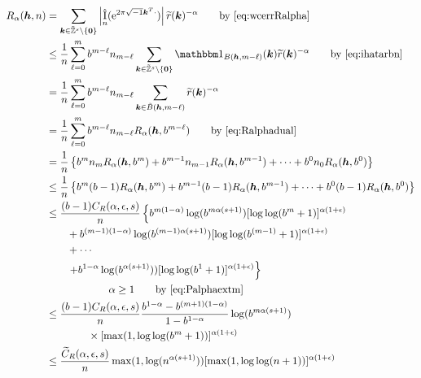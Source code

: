\documentclass{amsart}
\newcommand{\tr}{\widetilde{r}}
\DeclareMathOperator{\appxint}{\hat{I}}
\begin{document}
\begin{align*}
      R_\alpha(\vh,n) & = \sum_{\vk \in \tilde \integers^s \setminus\{\vzero\}} \abs{\appxint_n(\me^{2 \pi \sqrt{-1} \vk^T \cdot})}\tr(\vk)^{-\alpha} \qquad \text{by \eqref{eq:wcerrRalpha}} \\
      &\le \frac {1}{n} \sum_{\ell = 0}^{m} b^{m-\ell} n_{m - \ell} \sum_{\vk \in \tilde \integers^s \setminus\{\vzero\}} \bbone_{B(\vh,m-\ell)}(\vk) \tr(\vk)^{-\alpha} \qquad \text{by \eqref{eq:ihatarbn}} \\
      &= \frac {1}{n} \sum_{\ell = 0}^{m} b^{m-\ell} n_{m - \ell} \sum_{\vk \in \tilde B(\vh,m-\ell)} \tr(\vk)^{-\alpha} \\
      & = \frac {1}{n} \sum_{\ell = 0}^{m} b^{m-\ell} n_{m - \ell} R_\alpha(\vh,b^{m-\ell})
      \qquad \text{by \eqref{eq:Ralphadual}}\\
      & =  \frac {1}{n} \left\{ b^m n_m R_\alpha(\vh,b^m) + b^{m-1} n_{m-1} R_\alpha(\vh,b^{m-1}) + \cdots + b^0 n_0 R_\alpha(\vh,b^0)  \right\} \\
      &\le \frac {1}{n} \left\{ b^m (b-1) R_\alpha(\vh,b^m) + b^{m-1} (b-1) R_\alpha(\vh,b^{m-1}) + \cdots + b^0 (b-1) R_\alpha(\vh,b^0)  \right\} \\
      & \le \frac {(b-1)C_{R}(\alpha,\epsilon,s)}{n} \left\{ b^{m(1-\alpha)} \log(b^{m\alpha(s+1)}) [\log \log (
    b^m+1)]^{\alpha(1+\epsilon)}\right .\\ 
      & \qquad  + b^{(m-1)(1-\alpha)} \log(b^{(m-1)\alpha(s+1)}) [\log \log (
    b^{(m-1)}+1)]^{\alpha(1+\epsilon)}\\
      & \qquad + \cdots \\
      & \qquad  \left . + b^{1-\alpha} \log(b^{\alpha(s+1)})) [\log \log (
    b^{1}+1)]^{\alpha(1+\epsilon)} \right\}\\
      & \qquad \qquad \qquad \alpha \ge 1 \qquad \text{by \eqref{eq:Palphaextm}}\\ %
      & \le \frac {(b-1)C_{R}(\alpha,\epsilon,s)}{n} \frac{b^{1-\alpha} - b^{(m+1)(1-\alpha)}}{1 - b^{1-\alpha}}
       \log(b^{m\alpha(s+1)}) \\
      & \qquad \qquad \times [\max(1,\log \log (
    b^m+1))]^{\alpha(1+\epsilon)} \\
      & \le \frac {\widetilde{C}_{R}(\alpha,\epsilon,s)}{n}
       \max(1, \log(n^{\alpha(s+1)})) [\max(1,\log \log (
    n+1))]^{\alpha(1+\epsilon)} \\
\end{align*} 
\end{document}
